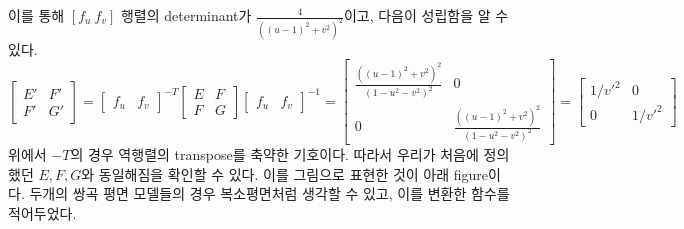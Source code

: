\documentclass[10pt,a4paper]{article}
\newcounter{fig}
\begin{document}
이를 통해 $[f_u~f_v]$ 행렬의 determinant가 $\frac{4}{((u-1)^2+v^2)^2}$이고, 다음이 성립함을 알 수 있다.\[
\begin{bmatrix}
E' & F'\\F' & G'
\end{bmatrix}
=
\begin{bmatrix}
f_u & f_v
\end{bmatrix}^{-T}
\begin{bmatrix}
E & F\\F & G
\end{bmatrix}
\begin{bmatrix}
f_u & f_v
\end{bmatrix}^{-1}
=
\begin{bmatrix}
\frac{((u-1)^2+v^2)^2}{(1-u^2-v^2)^2} & 0\\0 & \frac{((u-1)^2+v^2)^2}{(1-u^2-v^2)^2}
\end{bmatrix}
=
\begin{bmatrix}
1/v'^2 & 0\\0 & 1/v'^2
\end{bmatrix}
\]
위에서 $-T$의 경우 역행렬의 transpose를 축약한 기호이다. 따라서 우리가 처음에 정의했던 $E,F,G$와 동일해짐을 확인할 수 있다. 이를 그림으로 표현한 것이 아래 figure이다. 두개의 쌍곡 평면 모델들의 경우 복소평면처럼 생각할 수 있고, 이를 변환한 함수를 적어두었다.
\end{document}
